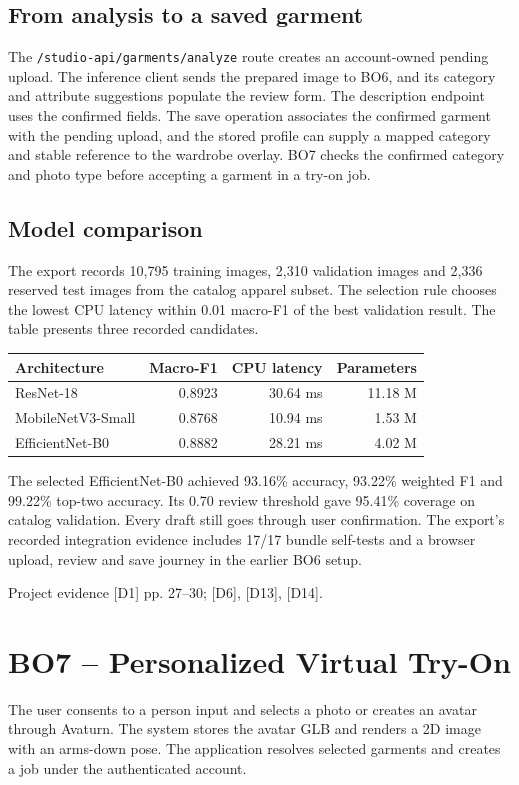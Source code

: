 \documentclass[11pt,a4paper]{article}
\newcommand{\src}[1]{\par{\footnotesize\textcolor{muted}{Project evidence #1.}}\par}
\newcommand{\file}[1]{\nolinkurl{#1}}
\begin{document}
\subsection*{From analysis to a saved garment}
The \file{/studio-api/garments/analyze} route creates an account-owned pending upload. The inference client sends the prepared image to BO6, and its category and attribute suggestions populate the review form. The description endpoint uses the confirmed fields. The save operation associates the confirmed garment with the pending upload, and the stored profile can supply a mapped category and stable reference to the wardrobe overlay. BO7 checks the confirmed category and photo type before accepting a garment in a try-on job.

\subsection*{Model comparison}
The export records 10,795 training images, 2,310 validation images and 2,336 reserved test images from the catalog apparel subset. The selection rule chooses the lowest CPU latency within 0.01 macro-F1 of the best validation result. The table presents three recorded candidates.

\begin{tabularx}{\linewidth}{@{}Yrrr@{}}
\toprule
\textbf{Architecture} & \textbf{Macro-F1} & \textbf{CPU latency} & \textbf{Parameters} \\
\midrule
ResNet-18 & 0.8923 & 30.64 ms & 11.18 M \\
MobileNetV3-Small & 0.8768 & 10.94 ms & 1.53 M \\
EfficientNet-B0 & 0.8882 & 28.21 ms & 4.02 M \\
\bottomrule
\end{tabularx}

The selected EfficientNet-B0 achieved 93.16\% accuracy, 93.22\% weighted F1 and 99.22\% top-two accuracy. Its 0.70 review threshold gave 95.41\% coverage on catalog validation. Every draft still goes through user confirmation. The export's recorded integration evidence includes 17/17 bundle self-tests and a browser upload, review and save journey in the earlier BO6 setup.
\src{[D1] pp. 27--30; [D6], [D13], [D14]}

\clearpage
\section{BO7 -- Personalized Virtual Try-On}
The user consents to a person input and selects a photo or creates an avatar through Avaturn. The system stores the avatar GLB and renders a 2D image with an arms-down pose. The application resolves selected garments and creates a job under the authenticated account.
\end{document}
